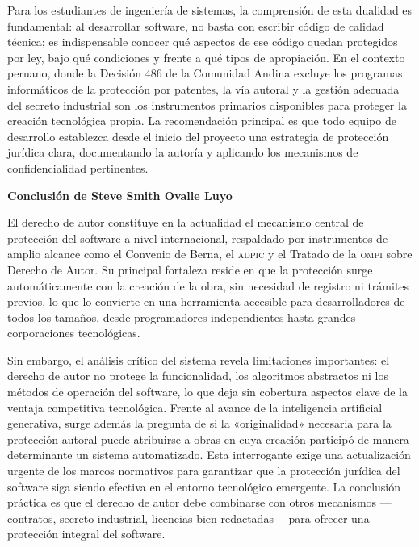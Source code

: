 \documentclass[11pt,a4paper]{report}
\begin{document}
Para los estudiantes de ingeniería de sistemas, la comprensión de esta dualidad es fundamental: al desarrollar software, no basta con escribir código de calidad técnica; es indispensable conocer qué aspectos de ese código quedan protegidos por ley, bajo qué condiciones y frente a qué tipos de apropiación. En el contexto peruano, donde la Decisión 486 de la Comunidad Andina excluye los programas informáticos de la protección por patentes, la vía autoral y la gestión adecuada del secreto industrial son los instrumentos primarios disponibles para proteger la creación tecnológica propia. La recomendación principal es que todo equipo de desarrollo establezca desde el inicio del proyecto una estrategia de protección jurídica clara, documentando la autoría y aplicando los mecanismos de confidencialidad pertinentes.

\vspace{0.8cm}

\noindent\textbf{Conclusión de Steve Smith Ovalle Luyo}

\smallskip

El derecho de autor constituye en la actualidad el mecanismo central de protección del software a nivel internacional, respaldado por instrumentos de amplio alcance como el Convenio de Berna, el \textsc{adpic} y el Tratado de la \textsc{ompi} sobre Derecho de Autor. Su principal fortaleza reside en que la protección surge automáticamente con la creación de la obra, sin necesidad de registro ni trámites previos, lo que lo convierte en una herramienta accesible para desarrolladores de todos los tamaños, desde programadores independientes hasta grandes corporaciones tecnológicas.

Sin embargo, el análisis crítico del sistema revela limitaciones importantes: el derecho de autor no protege la funcionalidad, los algoritmos abstractos ni los métodos de operación del software, lo que deja sin cobertura aspectos clave de la ventaja competitiva tecnológica. Frente al avance de la inteligencia artificial generativa, surge además la pregunta de si la «originalidad» necesaria para la protección autoral puede atribuirse a obras en cuya creación participó de manera determinante un sistema automatizado. Esta interrogante exige una actualización urgente de los marcos normativos para garantizar que la protección jurídica del software siga siendo efectiva en el entorno tecnológico emergente. La conclusión práctica es que el derecho de autor debe combinarse con otros mecanismos —contratos, secreto industrial, licencias bien redactadas— para ofrecer una protección integral del software.
\end{document}
